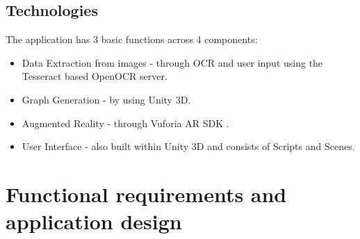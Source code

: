 \documentclass[a4paper,12pt]{article}
\begin{document}
\subsection{Technologies}
The application has 3 basic functions across 4 components:
\begin{itemize}
	\item Data Extraction from images - through OCR and user input using the Tesseract based OpenOCR server.
	\item Graph Generation - by using Unity 3D.
	\item Augmented Reality - through Vuforia AR SDK .
	\item User Interface - also built within Unity 3D and consists of Scripts and Scenes.	
\end{itemize}

\newpage
\section{Functional requirements and application design}
\end{document}
